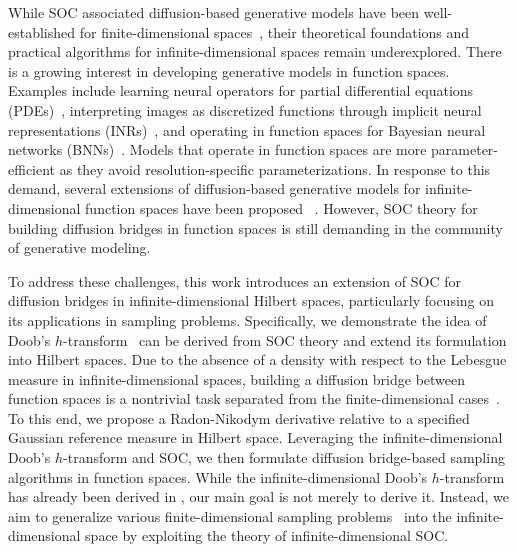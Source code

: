 \documentclass[nohyperref]{article}
\theoremstyle{plain}
\theoremstyle{remark}
\begin{document}
While SOC associated diffusion-based generative models have been well-established for finite-dimensional spaces~\citep{berner2022optimal,chen2022likelihood,chen2024generative, liu2024generalized}, their theoretical foundations and practical algorithms for infinite-dimensional spaces remain underexplored. 
There is a growing interest in developing generative models in function spaces. 
Examples include learning neural operators for partial differential equations (PDEs)~\citep{li2020fourier, li2022transformer, kovachki2023neural}, interpreting images as discretized functions through implicit neural representations (INRs)~\citep{sitzmann2020implicit, dupont2021coin}, and operating in function spaces for Bayesian neural networks (BNNs)~\citep{sun2019functional, wang2019function}. Models that operate in function spaces are more parameter-efficient as they avoid resolution-specific parameterizations. 
In response to this demand, several extensions of diffusion-based generative models for infinite-dimensional function spaces have been proposed ~\citep{pidstrigach2023infinite,lim2023score,hagemann2023multilevel,lim2023scorebased, franzese2024continuous, baldassari2024conditional}. 
However, SOC theory for building diffusion bridges in function spaces is still demanding in the community of generative modeling. 

To address these challenges, this work introduces an extension of SOC for diffusion bridges in infinite-dimensional Hilbert spaces, particularly focusing on its applications in sampling problems. 
Specifically, we demonstrate the idea of Doob's $h$-transform~\citep{rogers2000diffusions, chetrite2015nonequilibrium} can be derived from SOC theory and extend its formulation into Hilbert spaces. 
Due to the absence of a density with respect to the Lebesgue measure in infinite-dimensional spaces, building a diffusion bridge between function spaces is a nontrivial task separated from the finite-dimensional cases~\citep{peluchetti2023diffusion, shi2024diffusion}.
To this end, we propose a Radon-Nikodym derivative relative to a specified Gaussian reference measure in Hilbert space. 
Leveraging the infinite-dimensional Doob's $h$-transform and SOC, we then formulate diffusion bridge-based sampling algorithms in function spaces. While the infinite-dimensional Doob's $h$-transform has already been derived in \citep{fuhrman2003class,goldys2008ornstein,baker2024conditioning}, our main goal is not merely to derive it. Instead, we aim to generalize various finite-dimensional sampling problems~\citep{peluchetti2023diffusion, shi2024diffusion, zhang2022path, vargas2023bayesian} into the infinite-dimensional space by exploiting the theory of infinite-dimensional SOC.
\end{document}
